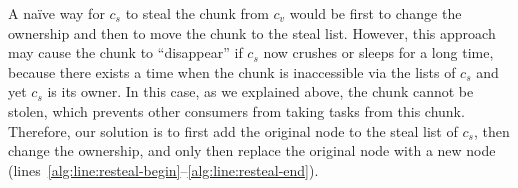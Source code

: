 A na\"{i}ve way for $c_s$ to steal the chunk from $c_v$ would be first to change the ownership and then to move the chunk to the steal list. However, this approach may cause the chunk to ``disappear'' if $c_s$ now crushes or sleeps for a long time, because there exists a time when the chunk is inaccessible via the lists of $c_s$ and yet $c_s$ is its owner. In this case, as we explained above, the chunk cannot be stolen, which prevents other consumers from taking tasks from this chunk. Therefore, our solution is to first add the original node to the steal list of $c_s$, then change the ownership, and only then replace the original node with a new node (lines~\ref{alg:line:resteal-begin}--\ref{alg:line:resteal-end}).